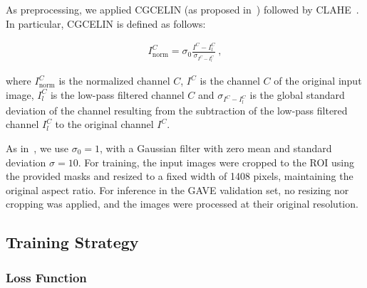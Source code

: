 \documentclass{article}
\begin{document}
As preprocessing, we applied \gls{CGCELIN} (as proposed in~\cite{morano2021simultaneous}) followed by \gls{CLAHE}~\cite{zuiderveld1994clahe}.
In particular, \gls{CGCELIN} is defined as follows:

\begin{align*}
I_{\mathrm{norm}}^C = \sigma_0  \frac{I^C-{I^C_l}}{\sigma_{I^C-{I^C_l}}} \ ,
\end{align*}

where $I_{\mathrm{norm}}^C$ is the normalized channel $C$, $I^C$ is the channel $C$ of the original input image, $I_l^C$ is the low-pass filtered channel $C$ and $\sigma_{I^C-I_l^C}$ is the global standard deviation of the channel resulting from the subtraction of the low-pass filtered channel $I_l^C$ to the original channel $I^C$.

As in~\cite{morano2021simultaneous}, we use $\sigma_0 = 1$, with a Gaussian filter with zero mean and standard deviation $\sigma = 10$.
For training, the input images were cropped to the \gls{ROI} using the provided masks and resized to a fixed width of 1408 pixels, maintaining the original aspect ratio.
For inference in the \gls{GAVE} validation set, no resizing nor cropping was applied, and the images were processed at their original resolution.


\subsection{Training Strategy}

\subsubsection*{Loss Function}
\end{document}
